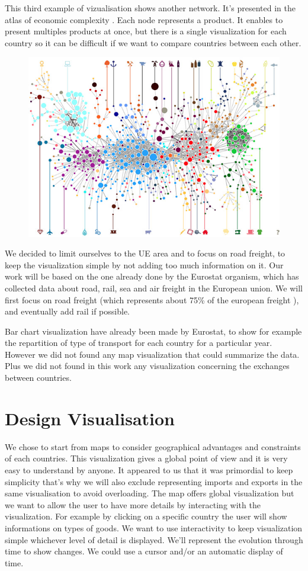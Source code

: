 \documentclass{vgtc}
\begin{document}
This third example of vizualisation shows another network. It’s presented in the atlas of economic complexity \cite{atlas}. Each node represents a product. It enables to present multiples products at once, but there is a single visualization for each country so it can be difficult if we want to compare countries between each other.

\begin{figure}[H]
\center
\includegraphics[scale=0.4]{economic_growth_atlas2.jpg}
\end{figure}

We decided to limit ourselves to the UE area and to focus on road freight, to keep the visualization simple by not adding too much information on it. Our work will be based on the one already done by the Eurostat organism, which has collected data about road, rail, sea and air freight in the European union. We will first focus on road freight (which represents about 75\% of the european freight \cite{dataset}), and eventually add rail if possible.

Bar chart visualization have already been made by Eurostat, to show for example the repartition of type of transport for each country for a particular year. However we did not found any map visualization that could summarize the data. Plus we did not found in this work any visualization concerning the exchanges between countries.

\section{Design Visualisation}
We chose to start from maps to consider geographical advantages and constraints of each countries. This visualization gives a global point of view and it is very easy to understand by anyone. It appeared to us that it was primordial to keep simplicity that’s why we will also exclude representing imports and exports in the same visualisation to avoid overloading.
The map offers global visualization but we want to allow the user to have more details by interacting with the visualization. For example by clicking on a specific country the user will show informations on types of goods.
We want to use interactivity to keep visualization simple whichever level of detail is displayed.
We’ll represent the evolution through time to show changes. We could use a cursor and/or an automatic display of time.
\end{document}
